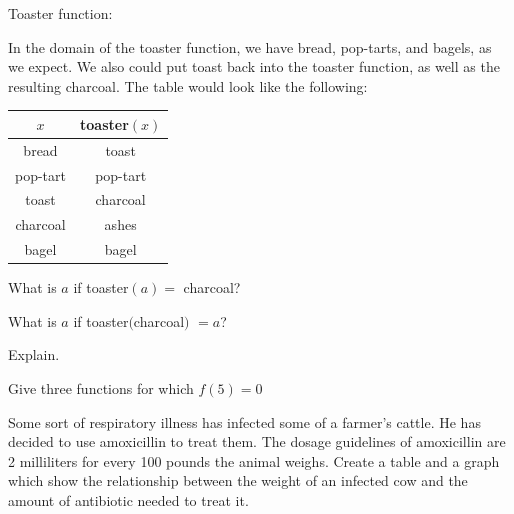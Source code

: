 \begin{exercise}

Toaster function:

In the domain of the toaster function, we have bread, pop-tarts, and bagels, as we expect.  We also could put toast back into the toaster function, as well as the resulting charcoal.  The table would look like the following:

\begin{tabular}{|c|c|}
\hline
$x$ & toaster$(x)$\\
\hline
bread & toast\\
\hline
pop-tart & pop-tart\\
\hline
toast & charcoal\\
\hline
charcoal & ashes\\
\hline
bagel & bagel\\
\hline
\end{tabular}

What is $a$ if toaster$(a) = $ charcoal?

What is $a$ if toaster$($charcoal$)$ $ = a$?

Explain.

\end{exercise}
\bigskip

\begin{exercise}
Give three functions for which $f(5) = 0$
\end{exercise}
\bigskip

\begin{exercise}
Some sort of respiratory illness has infected some of a farmer's cattle.  He has decided to use amoxicillin to treat them.  The dosage guidelines of amoxicillin are 2 milliliters for every 100 pounds the animal weighs.  Create a table and a graph which show the relationship between the weight of an infected cow and the amount of antibiotic needed to treat it.
\end{exercise}
\bigskip

